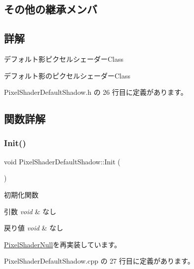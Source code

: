 \subsection*{その他の継承メンバ}


\subsection{詳解}
デフォルト影ピクセルシェーダー\+Class 

デフォルト影のピクセルシェーダー\+Class 

 Pixel\+Shader\+Default\+Shadow.\+h の 26 行目に定義があります。



\subsection{関数詳解}
\mbox{\label{class_pixel_shader_default_shadow_a22be67e887bcad8d9b6725cbae7e3abc}} 
\subsubsection{\texorpdfstring{Init()}{Init()}}
{\footnotesize\ttfamily void Pixel\+Shader\+Default\+Shadow\+::\+Init (\begin{DoxyParamCaption}{ }\end{DoxyParamCaption})\hspace{0.3cm}{\ttfamily [virtual]}}



初期化関数 


\begin{DoxyParams}{引数}
{\em void} & なし \\
\hline
\end{DoxyParams}

\begin{DoxyRetVals}{戻り値}
{\em void} & なし \\
\hline
\end{DoxyRetVals}


\mbox{\hyperlink{class_pixel_shader_null_a5318be2bf26892c385d863e3e8409571}{Pixel\+Shader\+Null}}を再実装しています。



 Pixel\+Shader\+Default\+Shadow.\+cpp の 27 行目に定義があります。

